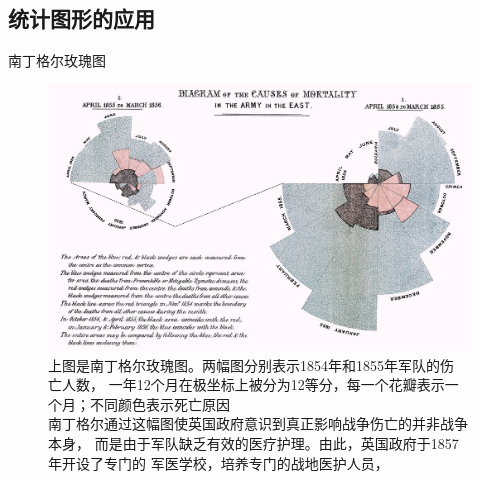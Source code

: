 \documentclass{beamerthemeMono}
\begin{document}
\subsection{统计图形的应用}
\begin{frame}{\subsecname}{南丁格尔玫瑰图}

 \begin{figure}
   \centering
   \includegraphics[width=0.8\columnwidth]{Nightingale_mortality.jpg}
   \caption{上图是南丁格尔玫瑰图。两幅图分别表示1854年和1855年军队的伤
     亡人数，
     一年12个月在极坐标上被分为12等分，每一个花瓣表示一个月；不同颜色表示死亡原因\\
     南丁格尔通过这幅图使英国政府意识到真正影响战争伤亡的并非战争本身，
     而是由于军队缺乏有效的医疗护理。由此，英国政府于1857年开设了专门的
     军医学校，培养专门的战地医护人员，}
 \end{figure}
\end{frame}
\end{document}
